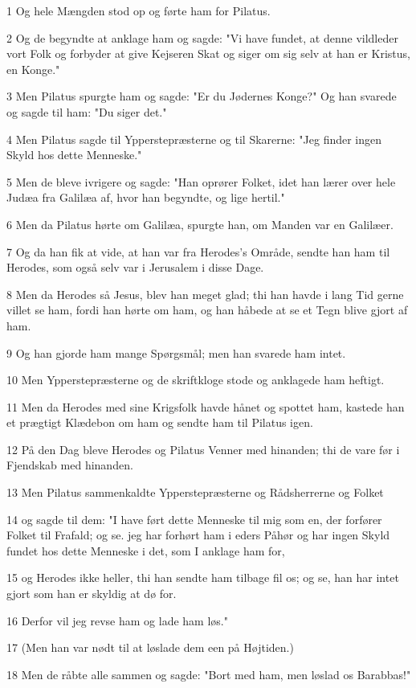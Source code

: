 \par 1 Og hele Mængden stod op og førte ham for Pilatus.
\par 2 Og de begyndte at anklage ham og sagde: "Vi have fundet, at denne vildleder vort Folk og forbyder at give Kejseren Skat og siger om sig selv at han er Kristus, en Konge."
\par 3 Men Pilatus spurgte ham og sagde: "Er du Jødernes Konge?" Og han svarede og sagde til ham: "Du siger det."
\par 4 Men Pilatus sagde til Ypperstepræsterne og til Skarerne: "Jeg finder ingen Skyld hos dette Menneske."
\par 5 Men de bleve ivrigere og sagde: "Han oprører Folket, idet han lærer over hele Judæa fra Galilæa af, hvor han begyndte, og lige hertil."
\par 6 Men da Pilatus hørte om Galilæa, spurgte han, om Manden var en Galilæer.
\par 7 Og da han fik at vide, at han var fra Herodes's Område, sendte han ham til Herodes, som også selv var i Jerusalem i disse Dage.
\par 8 Men da Herodes så Jesus, blev han meget glad; thi han havde i lang Tid gerne villet se ham, fordi han hørte om ham, og han håbede at se et Tegn blive gjort af ham.
\par 9 Og han gjorde ham mange Spørgsmål; men han svarede ham intet.
\par 10 Men Ypperstepræsterne og de skriftkloge stode og anklagede ham heftigt.
\par 11 Men da Herodes med sine Krigsfolk havde hånet og spottet ham, kastede han et prægtigt Klædebon om ham og sendte ham til Pilatus igen.
\par 12 På den Dag bleve Herodes og Pilatus Venner med hinanden; thi de vare før i Fjendskab med hinanden.
\par 13 Men Pilatus sammenkaldte Ypperstepræsterne og Rådsherrerne og Folket
\par 14 og sagde til dem: "I have ført dette Menneske til mig som en, der forfører Folket til Frafald; og se. jeg har forhørt ham i eders Påhør og har ingen Skyld fundet hos dette Menneske i det, som I anklage ham for,
\par 15 og Herodes ikke heller, thi han sendte ham tilbage fil os; og se, han har intet gjort som han er skyldig at dø for.
\par 16 Derfor vil jeg revse ham og lade ham løs."
\par 17 (Men han var nødt til at løslade dem een på Højtiden.)
\par 18 Men de råbte alle sammen og sagde: "Bort med ham, men løslad os Barabbas!"
